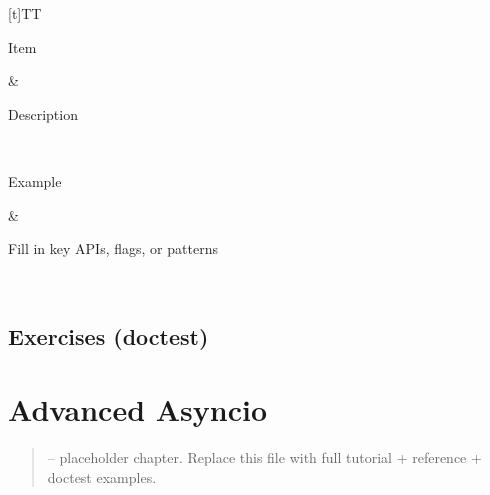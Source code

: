 \documentclass[a4paper,11pt,english]{sphinxmanual}
\begin{document}
\begin{savenotes}\sphinxattablestart
\sphinxthistablewithglobalstyle
\centering
\begin{tabulary}{\linewidth}[t]{TT}
\sphinxtoprule
\begin{varwidth}[t]{}
\sphinxstyletheadfamily \sphinxAtStartPar
Item
\sphinxbeforeendvarwidth
\end{varwidth}%
&\begin{varwidth}[t]{}
\sphinxstyletheadfamily \sphinxAtStartPar
Description
\sphinxbeforeendvarwidth
\end{varwidth}%
\\
\sphinxmidrule
\sphinxtableatstartofbodyhook\begin{varwidth}[t]{}
\sphinxAtStartPar
Example
\sphinxbeforeendvarwidth
\end{varwidth}%
&\begin{varwidth}[t]{}
\sphinxAtStartPar
Fill in key APIs, flags, or patterns
\sphinxbeforeendvarwidth
\end{varwidth}%
\\
\sphinxbottomrule
\end{tabulary}
\sphinxtableafterendhook\par
\sphinxattableend\end{savenotes}


\subsection{Exercises (doctest)}
\label{\detokenize{performance/timing:exercises-doctest}}
\begin{sphinxVerbatim}[commandchars=\\\{\}]
\end{sphinxVerbatim}

\sphinxstepscope


\section{Advanced Asyncio}
\label{\detokenize{concurrency/advanced_asyncio:advanced-asyncio}}\label{\detokenize{concurrency/advanced_asyncio::doc}}\begin{quote}

\sphinxAtStartPar
{} – placeholder chapter. Replace this file with full tutorial + reference + doctest examples.
\end{quote}
\end{document}
